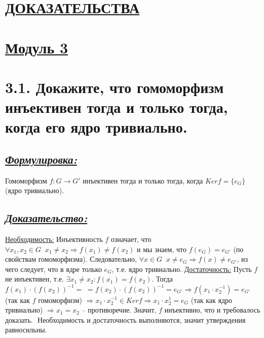 \documentclass{article}
\begin{document}
\newpage
{}
\section*{\LARGE\centering \underline{ДОКАЗАТЕЛЬСТВА}}
\section*{\LARGE\centering \underline{Модуль 3}}

\section*{\LARGE 3.1. Докажите, что гомоморфизм инъективен тогда и только тогда, когда его ядро тривиально. }
\subsection*{\Large \underline{\textit{Формулировка: }}}
Гомоморфизм $f : G \rightarrow G'$ инъективен тогда и только тогда, когда $Kerf = \{e_G\}$ (ядро тривиально).

\subsection*{\Large \underline{\textit{Доказательство: }}}

$ $\indent\underline{Необходимость:}
\newline Инъективность $f$ означает, что $\forall x_1, x_2 \in G \;\; x_1 \ne x_2 \Rightarrow f(x_1) \ne f(x_2)$ и мы знаем, что $f(e_G) = e_{G'}$ (по свойствам гомоморфизма). Следовательно, \newline $\forall x \in G \;\; x \ne e_G \Rightarrow f(x) \ne e_{G'}$, из чего следует, что в ядре только $e_G$, т.е. ядро тривиально.
\newline \indent \underline{Достаточность:}
\newline Пусть $f$ не инъективен, т.е. $\exists x_1 \ne x_2 : f(x_1) = f(x_2)$. Тогда $f(x_1) \cdot (f(x_2))^{-1} = \; = f(x_2) \cdot (f(x_2))^{-1} = e_{G'} \Rightarrow f(x_1 \cdot x_2^{-1}) = e_{G'}$ (так как $f$ гомоморфизм) $\Rightarrow x_1\cdot x_2^{-1} \in Kerf \Rightarrow x_1\cdot x_2^1 = e_{G}$ (так как ядро тривиально) $\Rightarrow x_1 = x_2$ -- противоречие. Значит, $f$ инъективно, что и требовалось доказать.
\newline $ $
\newline Необходимость и достаточность выполняются, значит утверждения равносильны.
\end{document}
